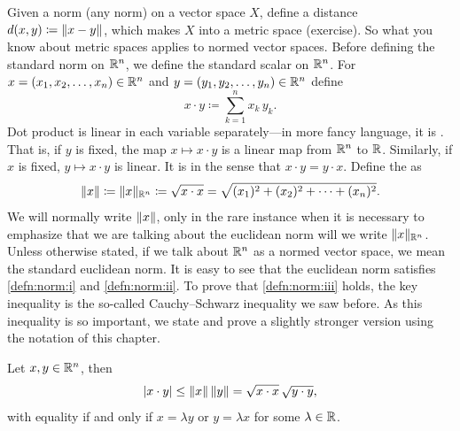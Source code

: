 Given a norm (any norm) on a vector space $X$,
define a distance $d(x,y) \coloneqq \lVert {x-y} \rVert$, which
makes $X$ into a metric space (exercise).
So what you know about metric spaces applies to normed vector spaces.
Before defining the standard norm on ${\mathbb{R}}^n$, we
define the standard 
scalar \emph{} on ${\mathbb{R}}^n$.
For 
$x=(x_1,x_2,\ldots,x_n) \in {\mathbb{R}}^n$
and $y=(y_1,y_2,\ldots,y_n) \in {\mathbb{R}}^n$ define
\begin{equation*}
x \cdot y \coloneqq \sum_{k=1}^n x_k\, y_k .
\end{equation*}
Dot product is linear in each variable
separately---in more fancy language, it is \emph{}.
That is,
if $y$ is fixed, the map $x \mapsto x \cdot y$ is a linear map from
${\mathbb{R}}^n$ to ${\mathbb{R}}$.  Similarly, if $x$ is fixed,
$y \mapsto x \cdot y$ is linear.
It is \emph{} in the sense that $x \cdot y = y \cdot x$.
Define the \emph{} as
\begin{equation*}
\lVert {x} \rVert \coloneqq \lVert {x} \rVert_{{\mathbb{R}}^n} \coloneqq \sqrt{x \cdot x} = \sqrt{(x_1)^2+(x_2)^2 + \cdots + (x_n)^2}.
\end{equation*}
We will normally write $\lVert {x} \rVert$, only in the rare instance when it is necessary to
emphasize that we are talking about the euclidean norm will we write
$\lVert {x} \rVert_{{\mathbb{R}}^n}$.
Unless otherwise stated, if we talk about ${\mathbb{R}}^n$ as a normed vector space,
we mean the standard euclidean norm.
It is easy to see that the euclidean norm satisfies \ref{defn:norm:i} and
\ref{defn:norm:ii}.  To prove
that \ref{defn:norm:iii} holds, the key
inequality is the so-called Cauchy--Schwarz inequality
we saw before.  As this inequality is so important, we state and
prove a slightly stronger version using the notation of this chapter.

\begin{thm}
Let $x, y \in {\mathbb{R}}^n$, then
\begin{equation*}
\sabs{x \cdot y} \leq \snorm{x} \, \snorm{y} = \sqrt{x\cdot x}\, \sqrt{y\cdot y},
\avoidbreak
\end{equation*}
with equality if and only if $x = \lambda y$ or $y = \lambda x$ for some
$\lambda \in {\mathbb{R}}$.
\end{thm}


